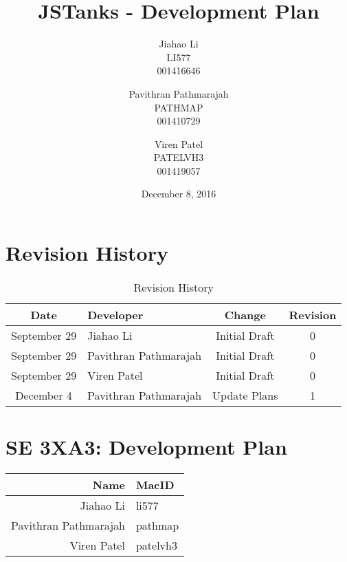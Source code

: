 \documentclass{article}
\begin{document}
\newpage
\title{JSTanks - Development Plan}
\date{December 8, 2016}
\author{Jiahao Li\\LI577\\001416646\and Pavithran Pathmarajah\\PATHMAP\\
001410729 \and Viren Patel\\PATELVH3\\001419057}

\maketitle

\newpage
{}

\section*{Revision History}
\begin{table}[h!]
  \centering
  \caption{Revision History}
  \label{tab:table1}
  \begin{tabular}{clcc}
	\toprule
	Date &  Developer & Change & Revision\\
	\midrule
	September 29&Jiahao Li &Initial Draft &0\\
	September 29&Pavithran Pathmarajah &Initial Draft &0\\
	September 29&Viren Patel  &Initial Draft &0\\
	\midrule
	December 4&Pavithran Pathmarajah &Update Plans &1\\
	\bottomrule
  \end{tabular}
\end{table}



\newpage
{}

\section*{SE 3XA3: Development Plan}

\begin{table}[h!]

  \begin{tabular}{r l}
	\toprule
	Name &  MacID \\
	\midrule
	Jiahao Li & li577 \\
	Pavithran Pathmarajah & pathmap\\
	Viren Patel  & patelvh3\\
	\bottomrule
  \end{tabular}
\end{table}
\end{document}
